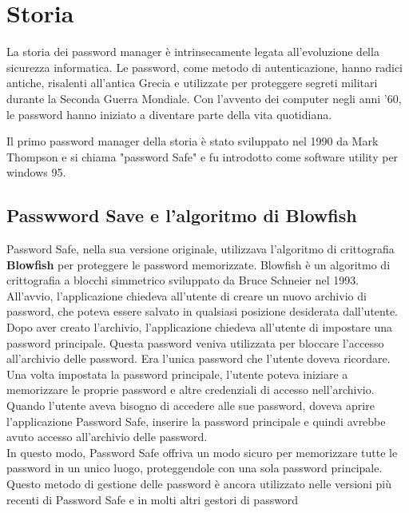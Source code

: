 \documentclass[a4paper,12pt]{report}
\begin{document}
	\chapter{Storia} 
		La storia dei password manager è intrinsecamente legata all'evoluzione della
		sicurezza informatica. Le password, come metodo di autenticazione, hanno radici
		antiche, risalenti all'antica Grecia e utilizzate per proteggere segreti
		militari durante la Seconda Guerra Mondiale. Con l'avvento dei computer negli
		anni '60, le password hanno iniziato a diventare parte della vita quotidiana.

		Il primo password manager della storia è stato sviluppato nel 1990 da Mark
		Thompson \cite{password-manager-hystory} e si chiama "password Safe" e 
		fu introdotto come software utility per windows 95. 

		\section{Passwword Save e l'algoritmo di Blowfish}
		Password Safe, nella sua versione originale, utilizzava l'algoritmo di
		crittografia \textbf{Blowfish} per proteggere le password memorizzate.
		Blowfish è un algoritmo di crittografia a blocchi simmetrico sviluppato da
		Bruce Schneier nel 1993.\\
		All'avvio, l'applicazione chiedeva all'utente di creare un nuovo archivio di
		password, che poteva essere salvato in qualsiasi posizione desiderata
		dall'utente. Dopo aver creato l'archivio, l'applicazione chiedeva all'utente di
		impostare una password principale. Questa password veniva utilizzata per
		bloccare l'accesso all'archivio delle password. Era l'unica password che
		l'utente doveva ricordare.\\
		Una volta impostata la password principale, l'utente poteva iniziare a
		memorizzare le proprie password e altre credenziali di accesso nell'archivio.
		Quando l'utente aveva bisogno di accedere alle sue password, doveva aprire
		l'applicazione Password Safe, inserire la password principale e quindi avrebbe
		avuto accesso all'archivio delle password.\\
		In questo modo, Password Safe offriva un modo sicuro per memorizzare tutte le
		password in un unico luogo, proteggendole con una sola password principale.
		Questo metodo di gestione delle password è ancora utilizzato nelle versioni più
		recenti di Password Safe e in molti altri gestori di password
\end{document}
